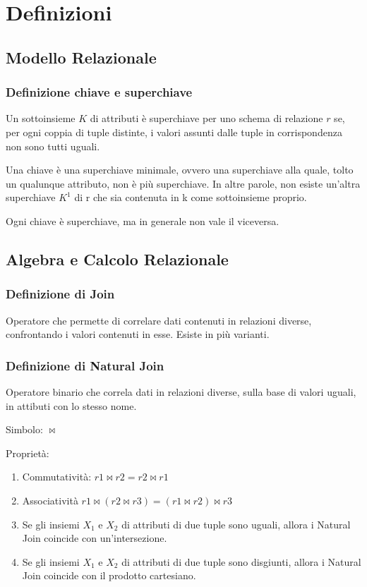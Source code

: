 \section{Definizioni}
\subsection{Modello Relazionale}
\subsubsection{Definizione chiave e superchiave}

Un sottoinsieme $K$ di attributi è superchiave per uno schema di relazione $r$
se, per ogni coppia di tuple distinte, i valori assunti dalle
tuple in corrispondenza non sono tutti uguali.

\noindent
Una chiave è una superchiave minimale, ovvero una superchiave alla quale,
tolto un qualunque attributo, non è più superchiave. In altre parole, non
esiste un'altra superchiave $K^1$ di r che sia contenuta in k come sottoinsieme proprio.

\noindent
Ogni chiave è superchiave,
ma in generale non vale il viceversa.

\subsection{Algebra e Calcolo Relazionale}
\subsubsection{Definizione di Join}
Operatore che permette di correlare dati contenuti in relazioni diverse,
confrontando i valori contenuti in esse. Esiste in più varianti.

\subsubsection{Definizione di Natural Join}
Operatore binario che correla dati in relazioni diverse, sulla base di valori
uguali, in attibuti con lo stesso nome.

\noindent
Simbolo: $\bowtie$

\noindent
Proprietà:

\begin{enumerate}
  \item Commutatività: $r1 \bowtie r2 = r2 \bowtie r1$
  \item Associatività $r1 \bowtie (r2 \bowtie r3) = (r1 \bowtie r2) \bowtie r3$
  \item Se gli insiemi $X_1$ e $X_2$ di attributi di due tuple sono uguali, allora i
  Natural Join coincide con un'intersezione.
  \item Se gli insiemi $X_1$ e $X_2$ di attributi di due tuple sono disgiunti, allora i
  Natural Join coincide con il prodotto cartesiano.
\end{enumerate}

